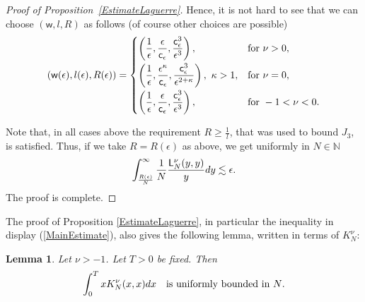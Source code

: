 \documentclass[11pt]{article}
\numberwithin{equation}{section}
\newtheorem{Lemma}[Theorem]{Lemma}
\begin{document}
\begin{proof}[Proof of Proposition~\ref{EstimateLaguerre}]
Hence, it is not hard to see that we can choose $(\mathsf{w},l,R)$ as follows (of course other choices are possible)
\begin{gather}\label{ChoiceOfConstants}
(\mathsf{w}(\epsilon),l(\epsilon),R(\epsilon))=\begin{cases}
\displaystyle \left(\frac{1}{\epsilon},\frac{\epsilon}{\mathsf{c}_{\epsilon}}, \frac{\mathsf{c}_{\epsilon}^3}{\epsilon^3}\right), &\text{for } \nu>0,\vspace{1mm}\\
\displaystyle\left(\frac{1}{\epsilon},\frac{\epsilon^{\kappa}}{\mathsf{c}_{\epsilon}}, \frac{\mathsf{c}_{\epsilon}^3}{\epsilon^{2+\kappa}}\right), \ \kappa>1, &\text{for } \nu=0,\vspace{1mm}\\
\displaystyle\left(\frac{1}{\epsilon},\frac{\epsilon}{\mathsf{c}_{\epsilon}}, \frac{\mathsf{c}_{\epsilon}^3}{\epsilon^3}\right), &\text{for } -1<\nu<0.
\end{cases}
\end{gather}

Note that, in all cases above the requirement $R\ge \frac{1}{l}$, that was used to bound $J_3$, is satisfied. Thus, if we take $R=R(\epsilon)$ as above, we get uniformly in $N \in \mathbb{N}$
\begin{gather*}
\int_{\frac{R(\epsilon)}{N}}^{\infty}\frac{1}{N}\frac{\mathsf{L}_N^{\nu}(y,y)}{y}{\rm d}y \lesssim \epsilon.
\end{gather*}
The proof is complete.
\end{proof}

The proof of Proposition \ref{EstimateLaguerre}, in particular the inequality in display (\ref{MainEstimate}), also gives the following lemma, written in terms of $K_N^{\nu}$:

\begin{Lemma}\label{LemmaUniformBoundedness}
Let $\nu>-1$. Let $T>0$ be fixed. Then
\begin{gather*}
\int_{0}^{T}xK^{\nu}_N(x,x){\rm d}x \quad \text{is uniformly bounded in $N$}.
\end{gather*}
\end{Lemma}
\end{document}
